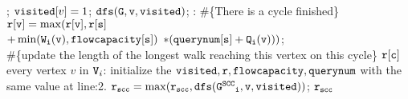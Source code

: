 \begin{algorithm}
\begin{algorithmic}[1]
 \STATE \qquad \qquad \qquad {}; 
 \STATE \qquad \qquad \qquad $\mathtt{visited}[v] = 1$; %
 \STATE \qquad \qquad \qquad $\mathtt{dfs(G, v, visited)}$;
 \STATE \qquad {}: \#\{There is a cycle finished\}
 \STATE \qquad \qquad \qquad $\mathtt{r[v] = \max(r[v], r[s]}$ 
 \\ \qquad \qquad \qquad \qquad \qquad
 $\mathtt{+ \min(\mathtt{W}_i(v), {flowcapacity}[s])}$ 
 $ \mathtt{* (querynum[s] + \mathtt{Q}_i(v)))}$; 
 \\
 \#\{update the length of the longest walk reaching this vertex on this cycle\}
 \STATE {} $\mathtt{r[c]}$
  every vertex $v$ in $\mathtt{V}_i$:
 \STATE \qquad initialize the $\mathtt{visited, r, flowcapacity, querynum}$ with the same value at line:2.
 \STATE \qquad $\mathtt{r_{scc} = \max(r_{scc}, dfs(\mathtt{G^{SCC}}_i, v, \mathtt{visited} ))}$; 
 \RETURN $\mathtt{r_{scc}}$
 \end{algorithmic}
 \end{algorithm}

